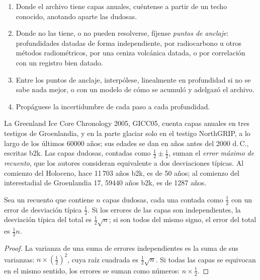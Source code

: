 \begin{method}\label{met:b2:climate-proxies:age-model}
\begin{enumerate}
  \item Donde el archivo tiene capas anuales, cuéntense a partir de un techo conocido, anotando aparte las
        dudosas.
  \item Donde no las tiene, o no pueden resolverse, fíjense \emph{puntos de anclaje}: profundidades datadas
        de forma independiente, por radiocarbono u otros métodos radiométricos, por una ceniza volcánica datada, o por
        correlación con un registro bien datado.
  \item Entre los puntos de anclaje, interpólese, linealmente en profundidad si no se sabe nada mejor, o con un
        modelo de cómo se acumuló y adelgazó el archivo.
  \item Propáguese la incertidumbre de cada paso a cada profundidad.
\end{enumerate}
\end{method}

La Greenland Ice Core Chronology 2005, GICC05, cuenta capas anuales en tres testigos de Groenlandia, y
en la parte glaciar solo en el testigo NorthGRIP, a lo largo de los últimos \num{60000} años; sus edades se
dan en años antes del 2000 d.\,C., escritas b2k. Las capas dudosas, contadas como $\frac12 \pm \frac12$,
suman el \emph{error máximo de recuento}, que los autores consideran equivalente a dos desviaciones típicas.
Al comienzo del Holoceno, hace 11\,703 años b2k, es de 50 años; al comienzo del
interestadial de Groenlandia 17, \num{59440} años b2k, es de \num{1287} años.

\begin{proposition}\label{prop:b2:climate-proxies:counting}
Sea un recuento que contiene $n$ capas dudosas, cada una contada como $\frac12$ con un error de desviación
típica $\frac12$. Si los errores de las capas son independientes, la desviación típica del
total es $\frac12\sqrt{n}$; si son todos del mismo signo, el error del total es
$\frac12 n$.
\end{proposition}

\begin{proof}
La varianza de una suma de errores independientes es la suma de sus varianzas: $n \times
(\frac12)^2$, cuya raíz cuadrada es $\frac12\sqrt{n}$. Si todas las capas se equivocan en el mismo sentido, los
errores se suman como números: $n \times \frac12$.
\end{proof}

